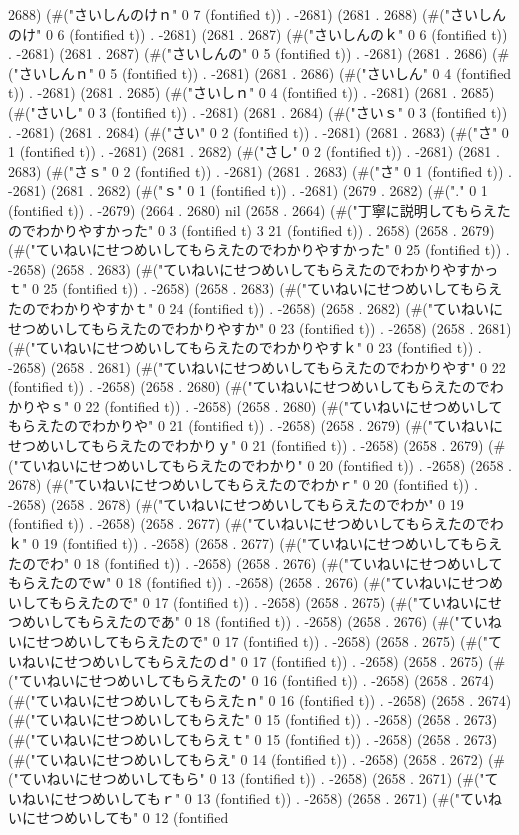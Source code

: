 2688) (#("さいしんのけｎ" 0 7 (fontified t)) . -2681) (2681 . 2688) (#("さいしんのけ" 0 6 (fontified t)) . -2681) (2681 . 2687) (#("さいしんのｋ" 0 6 (fontified t)) . -2681) (2681 . 2687) (#("さいしんの" 0 5 (fontified t)) . -2681) (2681 . 2686) (#("さいしんｎ" 0 5 (fontified t)) . -2681) (2681 . 2686) (#("さいしん" 0 4 (fontified t)) . -2681) (2681 . 2685) (#("さいしｎ" 0 4 (fontified t)) . -2681) (2681 . 2685) (#("さいし" 0 3 (fontified t)) . -2681) (2681 . 2684) (#("さいｓ" 0 3 (fontified t)) . -2681) (2681 . 2684) (#("さい" 0 2 (fontified t)) . -2681) (2681 . 2683) (#("さ" 0 1 (fontified t)) . -2681) (2681 . 2682) (#("さし" 0 2 (fontified t)) . -2681) (2681 . 2683) (#("さｓ" 0 2 (fontified t)) . -2681) (2681 . 2683) (#("さ" 0 1 (fontified t)) . -2681) (2681 . 2682) (#("ｓ" 0 1 (fontified t)) . -2681) (2679 . 2682) (#("." 0 1 (fontified t)) . -2679) (2664 . 2680) nil (2658 . 2664) (#("丁寧に説明してもらえたのでわかりやすかった" 0 3 (fontified t) 3 21 (fontified t)) . 2658) (2658 . 2679) (#("ていねいにせつめいしてもらえたのでわかりやすかった" 0 25 (fontified t)) . -2658) (2658 . 2683) (#("ていねいにせつめいしてもらえたのでわかりやすかっｔ" 0 25 (fontified t)) . -2658) (2658 . 2683) (#("ていねいにせつめいしてもらえたのでわかりやすかｔ" 0 24 (fontified t)) . -2658) (2658 . 2682) (#("ていねいにせつめいしてもらえたのでわかりやすか" 0 23 (fontified t)) . -2658) (2658 . 2681) (#("ていねいにせつめいしてもらえたのでわかりやすｋ" 0 23 (fontified t)) . -2658) (2658 . 2681) (#("ていねいにせつめいしてもらえたのでわかりやす" 0 22 (fontified t)) . -2658) (2658 . 2680) (#("ていねいにせつめいしてもらえたのでわかりやｓ" 0 22 (fontified t)) . -2658) (2658 . 2680) (#("ていねいにせつめいしてもらえたのでわかりや" 0 21 (fontified t)) . -2658) (2658 . 2679) (#("ていねいにせつめいしてもらえたのでわかりｙ" 0 21 (fontified t)) . -2658) (2658 . 2679) (#("ていねいにせつめいしてもらえたのでわかり" 0 20 (fontified t)) . -2658) (2658 . 2678) (#("ていねいにせつめいしてもらえたのでわかｒ" 0 20 (fontified t)) . -2658) (2658 . 2678) (#("ていねいにせつめいしてもらえたのでわか" 0 19 (fontified t)) . -2658) (2658 . 2677) (#("ていねいにせつめいしてもらえたのでわｋ" 0 19 (fontified t)) . -2658) (2658 . 2677) (#("ていねいにせつめいしてもらえたのでわ" 0 18 (fontified t)) . -2658) (2658 . 2676) (#("ていねいにせつめいしてもらえたのでｗ" 0 18 (fontified t)) . -2658) (2658 . 2676) (#("ていねいにせつめいしてもらえたので" 0 17 (fontified t)) . -2658) (2658 . 2675) (#("ていねいにせつめいしてもらえたのであ" 0 18 (fontified t)) . -2658) (2658 . 2676) (#("ていねいにせつめいしてもらえたので" 0 17 (fontified t)) . -2658) (2658 . 2675) (#("ていねいにせつめいしてもらえたのｄ" 0 17 (fontified t)) . -2658) (2658 . 2675) (#("ていねいにせつめいしてもらえたの" 0 16 (fontified t)) . -2658) (2658 . 2674) (#("ていねいにせつめいしてもらえたｎ" 0 16 (fontified t)) . -2658) (2658 . 2674) (#("ていねいにせつめいしてもらえた" 0 15 (fontified t)) . -2658) (2658 . 2673) (#("ていねいにせつめいしてもらえｔ" 0 15 (fontified t)) . -2658) (2658 . 2673) (#("ていねいにせつめいしてもらえ" 0 14 (fontified t)) . -2658) (2658 . 2672) (#("ていねいにせつめいしてもら" 0 13 (fontified t)) . -2658) (2658 . 2671) (#("ていねいにせつめいしてもｒ" 0 13 (fontified t)) . -2658) (2658 . 2671) (#("ていねいにせつめいしても" 0 12 (fontified 